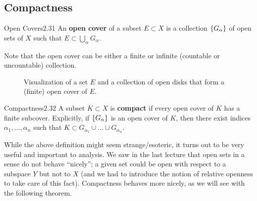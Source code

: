 \subsection{Compactness}
\begin{definition}{Open Covers}{2.31}
    An \textbf{open cover} of a subset $E \subset X$ is a collection $\set{G_\alpha}$ of open sets of $X$ such that $E \subset \bigcup_{\alpha} G_\alpha$.
\end{definition}
\noindent Note that the open cover can be either a finite or infinite (countable or uncountable) collection.
\begin{figure}[htbp]
    \centering
    \caption{Visualization of a set $E$ and a collection of open disks that form a (finite) open cover of $E$.}
    \label{fig11}
\end{figure}

\begin{definition}{Compactness}{2.32}
    A subset $K \subset X$ is \textbf{compact} if every open cover of $K$ has a finite subcover. Explicitly, if $\set{G_\alpha}$ is an open cover of $K$, then there exist indices $\alpha_1, \ldots, \alpha_n$ such that $K \subset G_{\alpha_1} \cup \ldots \cup G_{\alpha_n}$. 
\end{definition}
\noindent While the above definition might seem strange/esoteric, it turns out to be very useful and important to analysis. We saw in the last lecture that open sets in a sense do not behave ``nicely''; a given set could be open with respect to a subspace $Y$ but not to $X$ (and we had to introduce the notion of relative openness to take care of this fact). Compactness behaves more nicely, as we will see with the following theorem.

